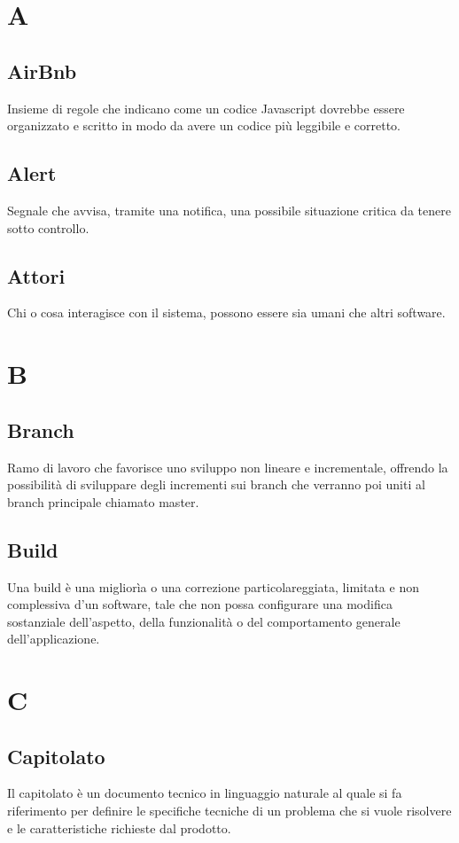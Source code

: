 \section{A}
    \subsection*{AirBnb}
Insieme di regole che indicano come un codice Javascript dovrebbe essere organizzato e scritto in modo da avere un codice più leggibile e corretto.
    \subsection*{Alert}
Segnale che avvisa, tramite una notifica, una possibile situazione critica da tenere sotto controllo.
    \subsection*{Attori}
Chi o cosa interagisce con il sistema, possono essere sia umani che altri software.
\newpage

\section{B}
    \subsection*{Branch}
Ramo di lavoro che favorisce uno sviluppo non lineare e incrementale, offrendo la possibilità di sviluppare degli incrementi sui branch che verranno poi uniti al branch principale chiamato master.
    \subsection*{Build}
Una build è una migliorìa o una correzione particolareggiata, limitata e non complessiva d'un software, tale che non possa configurare una modifica sostanziale dell'aspetto, della funzionalità o del comportamento generale dell'applicazione.
\newpage

\section{C}
    \subsection*{Capitolato}
Il capitolato è un documento tecnico in linguaggio naturale al quale si fa riferimento per definire le specifiche tecniche di un problema che si vuole risolvere e le caratteristiche richieste dal prodotto.
